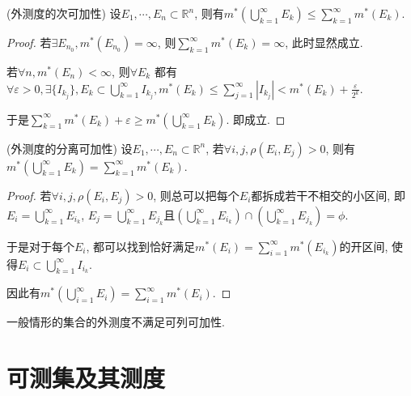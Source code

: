 \documentclass[theorem=false,mathfont=none,openany,sub3section]{easybook}
\begin{document}
\begin{theorem}
  (外测度的次可加性) 设$E_1, \cdots, E_n\subset \mathbb{R}^n$, 则有$m^{*}\left(\bigcup_{k=1}^{\infty}E_k\right)\leqslant \sum_{k=1}^{\infty}m^{*}(E_k)$.\par
\end{theorem}

\begin{proof}
  若$\exists E_{n_0}, m^{*}(E_{n_0})=\infty$, 则$\sum_{k=1}^{\infty}m^{*}(E_k)=\infty$, 此时显然成立.\par
  若$\forall n, m^{*}(E_n)<\infty$, 则$\forall E_k$ 都有$\forall \varepsilon >0, \exists \{I_{k_j}\}, E_k\subset \bigcup_{k=1}^{\infty}I_{k_j}, m^{*}(E_k)\leqslant \sum_{j=1}^{\infty}|I_{k_j}|<m^{*}(E_k)+\frac{\varepsilon}{2^k}$.\par
  于是$\sum_{k=1}^{\infty}m^{*}(E_k)+\varepsilon \geqslant m^{*}(\bigcup_{k=1}^{\infty}E_k)$. 即成立.\par
\end{proof}

\begin{theorem}
  (外测度的分离可加性) 设$E_1, \cdots, E_n\subset \mathbb{R}^n$, 若$\forall i,j, \rho(E_i,E_j)>0$, 则有$m^{*}\left(\bigcup_{k=1}^{\infty}E_k\right)= \sum_{k=1}^{\infty}m^{*}(E_k)$.\par
\end{theorem}

\begin{proof}
  若$\forall i,j, \rho(E_i,E_j)>0$, 则总可以把每个$E_i$都拆成若干不相交的小区间, 即$E_i=\bigcup_{k=1}^{\infty}E_{i_k}$, $E_j=\bigcup_{k=1}^{\infty}E_{j_k}$且$\left(\bigcup_{k=1}^{\infty}E_{i_k}\right)\cap \left(\bigcup_{k=1}^{\infty}E_{j_k}\right) = \phi $.\par
  于是对于每个$E_i$, 都可以找到恰好满足$m^{*}(E_i)=\sum_{i=1}^{\infty}m^{*}(E_{i_k})$的开区间, 使得$E_i\subset \bigcup_{k=1}^{\infty}I_{i_k}$.\par
  因此有$m^{*}\left(\bigcup_{i=1}^{\infty}E_i\right)= \sum_{i=1}^{\infty}m^{*}(E_i)$.\par
\end{proof}

\begin{remark}
  一般情形的集合的外测度不满足可列可加性.\par
\end{remark}

\newpage

\section{可测集及其测度}
\end{document}
